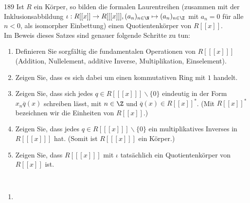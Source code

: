 \begin{algebraUE}{189}
Ist $R$ ein Körper, so bilden die formalen Laurentreihen (zusammen mit der
Inklusionsabbildung $\iota: R[[x]] \rightarrow R[[[x]]], (a_n)_{n \in \N}
\mapsto (a_n)_{n \in \Z}$ mit $a_n = 0$ für alle $n < 0$, als isomorpher
Einbettung) einen Quotientenkörper von $R[[x]]$. \\
Im Beweis dieses Satzes sind genauer folgende Schritte zu tun:
\begin{enumerate}
  \item Definieren Sie sorgfältig die fundamentalen Operationen von $R[[[x]]]$
  (Addition, Nullelement, additive Inverse, Multiplikation, Einselement).
  \item Zeigen Sie, dass es sich dabei um einen kommutativen Ring mit $1$ handelt.
  \item Zeigen Sie, dass sich jedes $q \in R[[[x]]]\backslash \{0\}$ eindeutig in
  der Form $x_n\overline{q}(x)$ schreiben lässt, mit $n \in \Z$ und $\overline{q}(x) \in R[[x]]^*$.
  (Mit $R[[x]]^*$ bezeichnen wir die Einheiten von $R[[x]]$.)
  \item Zeigen Sie, dass jedes $q \in R[[[x]]]\backslash\{0\}$ ein multiplikatives
  Inverses in $R[[[x]]]$ hat. (Somit ist $R[[[x]]]$ ein Körper.)
  \item Zeigen Sie, dass $R[[[x]]]$ mit $\iota$ tatsächlich ein Quotientenkörper
  von $R[[x]]$ ist.
\end{enumerate}
\end{algebraUE}
\begin{solution}
\leavevmode \\
\begin{enumerate}
  \item 
\end{enumerate}
\end{solution}
